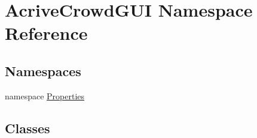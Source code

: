 \hypertarget{namespace_acrive_crowd_g_u_i}{}\section{Acrive\+Crowd\+G\+U\+I Namespace Reference}
\label{namespace_acrive_crowd_g_u_i}
\subsection*{Namespaces}
\begin{DoxyCompactItemize}
\item 
namespace \hyperlink{namespace_acrive_crowd_g_u_i_1_1_properties}{Properties}
\end{DoxyCompactItemize}
\subsection*{Classes}
